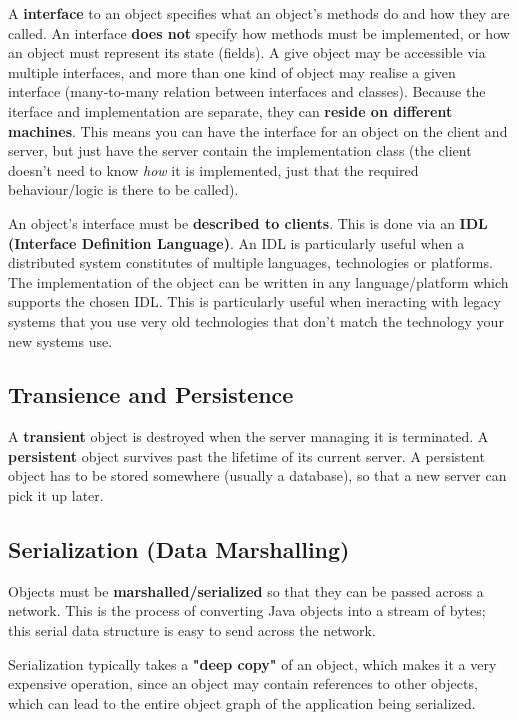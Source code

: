 \documentclass{article}
\begin{document}
A \textbf{interface} to an object specifies what an object's methods do and how they are called. An interface \textbf{does not} specify how methods must be implemented, or how an object must represent its state (fields). A give object may be accessible via multiple interfaces, and more than one kind of object may realise a given interface (many-to-many relation between interfaces and classes). Because the iterface and implementation are separate, they can \textbf{reside on different machines}. This means you can have the interface for an object on the client and server, but just have the server contain the implementation class (the client doesn't need to know \textit{how} it is implemented, just that the required behaviour/logic is there to be called).

An object's interface must be \textbf{described to clients}. This is done via an \textbf{IDL (Interface Definition Language)}. An IDL is particularly useful when a distributed system constitutes of multiple languages, technologies or platforms. The implementation of the object can be written in any language/platform which supports the chosen IDL. This is particularly useful when ineracting with legacy systems that you use very old technologies that don't match the technology your new systems use.

\subsection{Transience and Persistence}

A \textbf{transient} object is destroyed when the server managing it is terminated. A \textbf{persistent} object survives past the lifetime of its current server. A persistent object has to be stored somewhere (usually a database), so that a new server can pick it up later. 

\subsection{Serialization (Data Marshalling)}

Objects must be \textbf{marshalled/serialized} so that they can be passed across a network. This is the process of converting Java objects into a stream of bytes; this serial data structure is easy to send across the network.

Serialization typically takes a \textbf{"deep copy"} of an object, which makes it a very expensive operation, since an object may contain references to other objects, which can lead to the entire object graph of the application being serialized.
\end{document}
